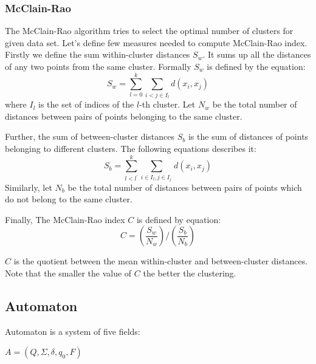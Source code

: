 \documentclass{article}
\begin{document}
\subsubsection{McClain-Rao}
The McClain-Rao algorithm tries to select the optimal number of clusters for given data set. Let's define few measures needed to compute McClain-Rao index. Firstly we define the sum within-cluster distances $S_w$. It sums up all the distances of any two points from the same cluster. Formally $S_w$ is defined by the equation: 
\begin{equation}
	S_w = \sum_{l=0}^{k} \sum_{i < j \in I_l} d(x_i, x_j)
\end{equation}
where $I_l$ is the set of indices of the $l$-th cluster. Let $N_w$ be the total number of distances between pairs of points belonging to the same cluster.

Further, the sum of between-cluster distances $S_b$ is the sum of distances of points belonging to different clusters. The following equations describes it:
\begin{equation}
	S_b = \sum_{l < l^{'}}^{k} \sum_{i \in I_{l}, j \in I_{l^{'}}}  d(x_i, x_j)
\end{equation}
Similarly, let $N_b$ be the total number of distances between pairs of points which do not belong to the same cluster.

Finally, The McClain-Rao index $C$ is defined by equation: 
\begin{equation}
	C =  (\frac{S_w}{N_w}) / (\frac{S_b}{N_b})
\end{equation}

$C$ is the quotient between the mean within-cluster and between-cluster distances.
Note that the smaller the value of $C$ the better the clustering.

\subsection{Automaton} \label{sec:autom}
Automaton is a system of five fields:
\begin{center}
	$A = (Q, \Sigma, \delta, q_0, F)$
\end{center}
\end{document}
